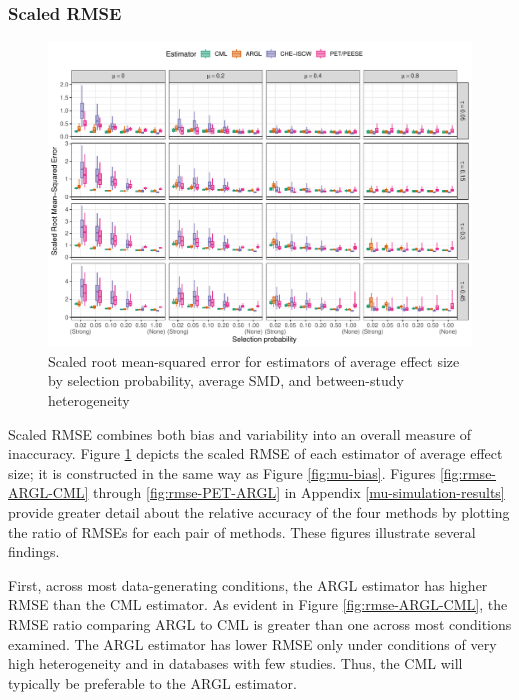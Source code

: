 \documentclass[
  american,
  man, donotrepeattitle,floatsintext]{apa7}
\begin{document}
\subsubsection{Scaled RMSE}\label{scaled-rmse}

\begin{figure}
\includegraphics{step-function-selection-models-with-dependent-effects_files/figure-latex/mu-rmse-1} \caption{Scaled root mean-squared error for estimators of average effect size by selection probability, average SMD, and between-study heterogeneity}\label{fig:mu-rmse}
\end{figure}

Scaled RMSE combines both bias and variability into an overall measure of inaccuracy.
Figure \ref{fig:mu-rmse} depicts the scaled RMSE of each estimator of average effect size; it is constructed in the same way as Figure \ref{fig:mu-bias}.
Figures \ref{fig:rmse-ARGL-CML} through \ref{fig:rmse-PET-ARGL} in Appendix \ref{mu-simulation-results} provide greater detail about the relative accuracy of the four methods by plotting the ratio of RMSEs for each pair of methods.
These figures illustrate several findings.

First, across most data-generating conditions, the ARGL estimator has higher RMSE than the CML estimator. As evident in Figure \ref{fig:rmse-ARGL-CML}, the RMSE ratio comparing ARGL to CML is greater than one across most conditions examined.
The ARGL estimator has lower RMSE only under conditions of very high heterogeneity and in databases with few studies.
Thus, the CML will typically be preferable to the ARGL estimator.
\end{document}
